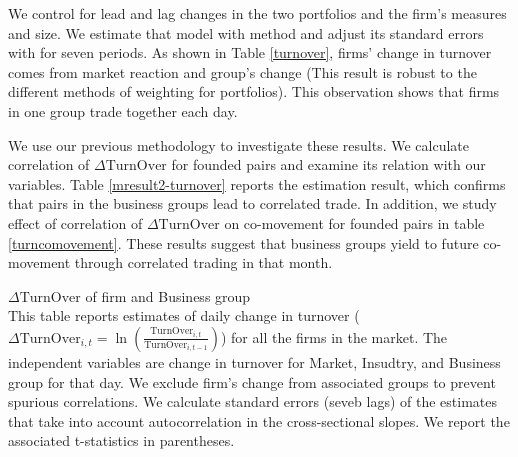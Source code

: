 		
	  We control for lead and lag changes in the two portfolios and the firm's measures and size. We estimate that model with \cite{FamaMacBeth} method and adjust its standard errors with \cite{newey1987hypothesis} for seven periods.  As shown in Table \ref{turnover}, firms' change in turnover comes from market reaction and group's change (This result is robust to the different methods of weighting for portfolios). This observation shows that firms in one group trade together each day. 
	
	We use our previous methodology to investigate these results. We calculate correlation of $ \Delta \text{TurnOver} $ for founded pairs and examine its relation with our variables. Table \ref{mresult2-turnover} reports the estimation result, which confirms that pairs in the business groups lead to correlated trade. In addition, we study effect of  correlation of $ \Delta \text{TurnOver} $ on co-movement for founded pairs in table \ref{turncomovement}. These results suggest that business groups yield to future co-movement through correlated trading in that month.
  
  
  
  
  
  
{\begin{table}[htbp]
	\centering
	\caption{$\Delta \text{TurnOver}$ of firm and Business group\\
	This table reports \cite{FamaMacBeth} estimates of daily change in turnover ($ \Delta \text{TurnOver}_{i,t} = \ln(\frac{\text{TurnOver}_{i,t}}{\text{TurnOver}_{i,t-1}}) $) for all the firms in the market. The independent variables are change in turnover for Market, Insudtry, and Business group for that day. We exclude firm's change from associated groups to prevent spurious correlations. We calculate \cite{newey1987hypothesis} standard errors (seveb lags) of the \cite{FamaMacBeth} estimates that take into account autocorrelation in the cross-sectional slopes. We report the associated t-statistics in parentheses. }
		\label{turnover}
	\resizebox{!}{!}{
		
	} 
\end{table}}

